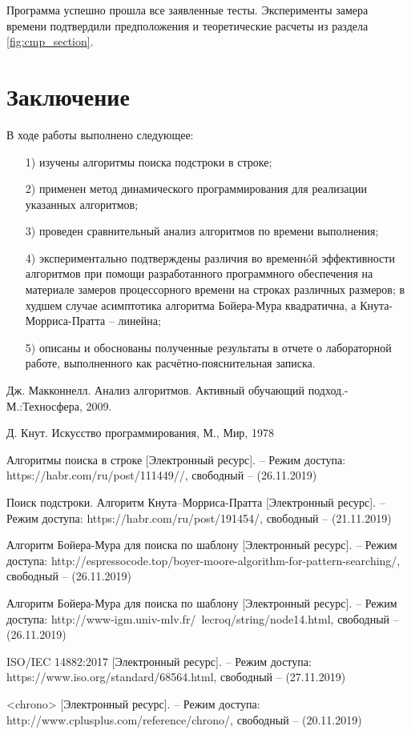 \documentclass[a4paper,12pt]{article}
\begin{document}
Программа успешно прошла все заявленные тесты. Эксперименты замера времени подтвердили предположения и
теоретические расчеты из раздела \ref{fig:cmp_section}.

\newpage
\section*{Заключение}

В ходе работы выполнено следующее:
	
\begin{enumerate} 
\item[1)] изучены алгоритмы поиска подстроки в строке;
\item[2)] применен метод динамического программирования для  
реализации указанных алгоритмов;
\item[3)] проведен сравнительный анализ алгоритмов по времени выполнения;
\item[4)] экспериментально подтверждены различия во временнóй эффективности алгоритмов 
при помощи разработанного программного обеспечения на материале замеров процессорного 
времени на строках различных размеров; в худшем случае
асимптотика алгоритма Бойера-Мура квадратична, а Кнута-Морриса-Пратта -- линейна;
\item[5)] описаны и обоснованы полученные результаты в отчете о лабораторной 
работе, выполненного как расчётно-пояснительная записка. 
\end{enumerate}

\newpage
{}
\begin{thebibliography}{8}

Дж. Макконнелл. Анализ алгоритмов. Активный 
обучающий 
подход.-М.:Техносфера, 2009.

Д. Кнут. Искусство программирования, М., Мир, 1978

Алгоритмы поиска в строке [Электронный ресурс]. – Режим доступа: https://habr.com/ru/post/111449//, свободный – (26.11.2019)

Поиск подстроки. Алгоритм Кнута–Морриса-Пратта [Электронный ресурс]. – Режим доступа: https://habr.com/ru/post/191454/, свободный – (21.11.2019)

Алгоритм Бойера-Мура для поиска по шаблону [Электронный ресурс]. – Режим доступа: http://espressocode.top/boyer-moore-algorithm-for-pattern-searching/, свободный – (26.11.2019)

Алгоритм Бойера-Мура для поиска по шаблону [Электронный ресурс]. – Режим доступа: http://www-igm.univ-mlv.fr/~lecroq/string/node14.html, свободный – (26.11.2019)

ISO/IEC 14882:2017 [Электронный ресурс]. – Режим доступа: https://www.iso.org/standard/68564.html, свободный – (27.11.2019)

<chrono> [Электронный ресурс]. – Режим доступа: http://www.cplusplus.com/reference/chrono/, свободный – (20.11.2019)

\end{thebibliography}
\end{document}
